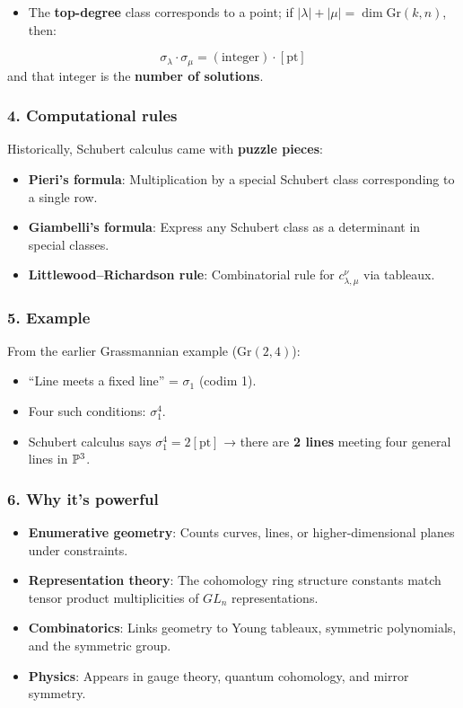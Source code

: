 \documentclass{amsart}
\let\originalmathbb\mathbb
\renewcommand{\mathbb}[1]{%
    \ifstrequal{#1}{1}{\mathbbm{#1}}{\originalmathbb{#1}}%
}
\theoremstyle{plain}
\theoremstyle{definition}
\theoremstyle{remark}
\begin{document}
\begin{itemize}
	\item The \textbf{top-degree} class corresponds to a point; if $|\lambda| + |\mu| = \dim\mathrm{Gr}(k,n)$, then:
\end{itemize}
\[
\sigma_\lambda \cdot \sigma_\mu = (\text{integer}) \cdot [\text{pt}]
\]
and that integer is the \textbf{number of solutions}.

\subsubsection{4. \textbf{Computational rules}}

Historically, Schubert calculus came with \textbf{puzzle pieces}:

\begin{itemize}
	\item \textbf{Pieri’s formula}: Multiplication by a special Schubert class corresponding to a single row.
	\item \textbf{Giambelli’s formula}: Express any Schubert class as a determinant in special classes.
	\item \textbf{Littlewood–Richardson rule}: Combinatorial rule for $c_{\lambda,\mu}^\nu$ via tableaux.
\end{itemize}

\subsubsection{5. \textbf{Example}}

From the earlier Grassmannian example ($\mathrm{Gr}(2,4)$):

\begin{itemize}
	\item “Line meets a fixed line” = $\sigma_1$ (codim 1).
	\item Four such conditions: $\sigma_1^4$.
	\item Schubert calculus says $\sigma_1^4 = 2[\text{pt}]$ → there are \textbf{2 lines} meeting four general lines in $\mathbb{P}^3$.
\end{itemize}

\subsubsection{6. \textbf{Why it’s powerful}}

\begin{itemize}
	\item \textbf{Enumerative geometry}: Counts curves, lines, or higher-dimensional planes under constraints.
	\item \textbf{Representation theory}: The cohomology ring structure constants match tensor product multiplicities of $GL_n$ representations.
	\item \textbf{Combinatorics}: Links geometry to Young tableaux, symmetric polynomials, and the symmetric group.
	\item \textbf{Physics}: Appears in gauge theory, quantum cohomology, and mirror symmetry.
\end{itemize}
\end{document}
